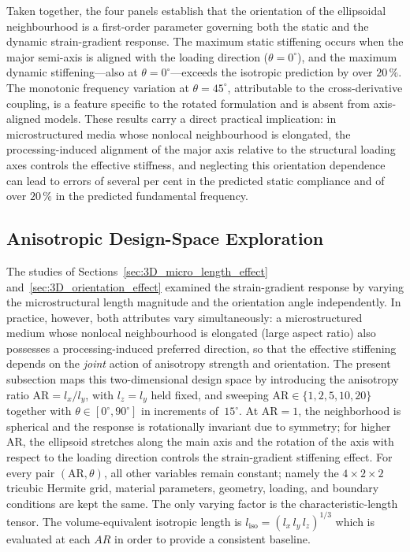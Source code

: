 \documentclass[final,3p,times,fleqn]{elsarticle}
\begin{document}
Taken together, the four panels establish that the orientation of the
ellipsoidal neighbourhood is a first-order parameter governing both the
static and the dynamic strain-gradient response.
The maximum static stiffening occurs when the major semi-axis is aligned
with the loading direction ($\theta = 0^{\circ}$), and the maximum
dynamic stiffening---also at $\theta = 0^{\circ}$---exceeds the
isotropic prediction by over $20\,\%$.
The monotonic frequency variation at $\theta = 45^{\circ}$,
attributable to the cross-derivative coupling, is a feature specific to
the rotated formulation and is absent from axis-aligned models.
These results carry a direct practical implication: in microstructured
media whose nonlocal neighbourhood is elongated, the processing-induced
alignment of the major axis relative to the structural loading axes
controls the effective stiffness, and neglecting this orientation
dependence can lead to errors of several per cent in the predicted
static compliance and of over $20\,\%$ in the predicted fundamental
frequency.


\subsection{Anisotropic Design-Space Exploration}
\label{sec:3D_design_space}


The studies of Sections~\ref{sec:3D_micro_length_effect}
and~\ref{sec:3D_orientation_effect} examined the strain-gradient
response by varying the microstructural length magnitude and the
orientation angle independently.
In practice, however, both attributes vary simultaneously: a
microstructured medium whose nonlocal neighbourhood is elongated
(large aspect ratio) also possesses a processing-induced preferred
direction, so that the effective stiffening depends on the
\emph{joint} action of anisotropy strength and orientation.
The present subsection maps this two-dimensional design space by
introducing the anisotropy ratio
$\mathrm{AR} = l_{x}/l_{y}$, with $l_{z} = l_{y}$ held fixed, and
sweeping $\mathrm{AR}\in\{1,2,5,10,20\}$ together with
$\theta\in[0^{\circ},90^{\circ}]$ in increments of~$15^{\circ}$.
At $\mathrm{AR} = 1$, the neighborhood is spherical and the response
is rotationally invariant due to symmetry; for higher AR, the ellipsoid
stretches along the main axis and the rotation of the axis with respect
to the loading direction controls the strain-gradient stiffening effect.
For every pair $(\mathrm{AR}, \theta)$, all other variables remain constant;
namely the $4\times2\times2$ tricubic Hermite grid,
material parameters, geometry, loading, and boundary conditions are kept the same.
The only varying factor is the characteristic-length tensor.
The volume-equivalent isotropic length is
$l_{\mathrm{iso}} = (l_{x}\,l_{y}\,l_{z})^{1/3}$ which is evaluated at each $AR$ in order to provide a consistent baseline.
\end{document}
